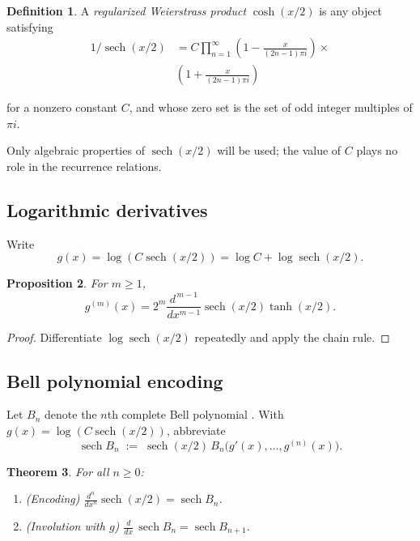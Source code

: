 \documentclass[article]{article}
\theoremstyle{plain}
\newtheorem{theorem}{Theorem}[section]
\newtheorem{proposition}[theorem]{Proposition}
\theoremstyle{definition}
\newtheorem{definition}[theorem]{Definition}
\DeclareMathOperator{\sech}{sech}
\begin{document}
\begin{definition}

A \emph{regularized Weierstrass product} $\cosh(x/2)$ is any object
satisfying
\begin{align*}
  1/\sech(x/2)&=C\prod_{n=1}^{\infty}\left(1-\frac{x}{(2n-1)\pi i}\right)\times \\
&\left(1+\frac{x}{(2n-1)\pi i}\right)
\end{align*}

for a nonzero constant $C$, and whose zero set is the set of odd integer
multiples of $\pi i$.
\end{definition}

Only algebraic properties of $\sech(x/2)$ will be used; the value of $C$ plays
no role in the recurrence relations.


\subsection{Logarithmic derivatives}

Write
\[
g(x)=\log (C \sech(x/2))=\log C + \log\sech(x/2).
\]

\begin{proposition}\label{prop:log_derivatives}
For $m\ge1$,
\[
g^{(m)}(x)=2^{m}\frac{d^{\,m-1}}{dx^{m-1}}\sech(x/2)\tanh(x/2).
\]
\end{proposition}

\begin{proof}
Differentiate $\log\sech(x/2)$ repeatedly and apply the chain rule.
\end{proof}


\subsection{Bell polynomial encoding}

Let $B_{n}$ denote the $n$th complete Bell polynomial \cite{Bell1934,BellPolynomialsCombo}.
With $g(x)=\log(C\sech(x/2))$, abbreviate
\[
  \sech B_{n} \;:=\; \sech(x/2)\,B_{n}\!\bigl(g'(x),\dots,g^{(n)}(x)\bigr).
\]

\begin{theorem}\label{thm:bell_polynomial}
For all $n\ge 0$:
\begin{enumerate}
\item[\textup{(i)}] \textup{(Encoding)}\enspace
  $\displaystyle\frac{d^{n}}{dx^{n}}\sech(x/2)=\sech B_{n}$.
\item[\textup{(ii)}] \textup{(Involution with $g$)}\enspace
  $\displaystyle\frac{d}{dx}\,\sech B_{n}=\sech B_{n+1}$.
\end{enumerate}
\end{theorem}
\end{document}
